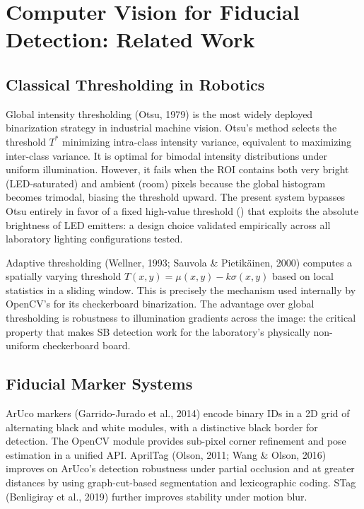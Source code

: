 \section{Computer Vision for Fiducial Detection: Related Work}

\subsection{Classical Thresholding in Robotics}

Global intensity thresholding (Otsu, 1979) is the most widely deployed binarization strategy in industrial machine vision. Otsu's method selects the threshold $T^*$ minimizing intra-class intensity variance, equivalent to maximizing inter-class variance. It is optimal for bimodal intensity distributions under uniform illumination. However, it fails when the ROI contains both very bright (LED-saturated) and ambient (room) pixels because the global histogram becomes trimodal, biasing the threshold upward. The present system bypasses Otsu entirely in favor of a fixed high-value threshold () that exploits the absolute brightness of LED emitters: a design choice validated empirically across all laboratory lighting configurations tested.

Adaptive thresholding (Wellner, 1993; Sauvola \& Pietikäinen, 2000) computes a spatially varying threshold $T(x,y) = \mu(x,y) - k\sigma(x,y)$ based on local statistics in a sliding window. This is precisely the mechanism used internally by OpenCV's  for its checkerboard binarization. The advantage over global thresholding is robustness to illumination gradients across the image: the critical property that makes SB detection work for the laboratory's physically non-uniform checkerboard board.

\subsection{Fiducial Marker Systems}

ArUco markers (Garrido-Jurado et al., 2014) encode binary IDs in a 2D grid of alternating black and white modules, with a distinctive black border for detection. The OpenCV  module provides sub-pixel corner refinement and pose estimation in a unified API. AprilTag (Olson, 2011; Wang \& Olson, 2016) improves on ArUco's detection robustness under partial occlusion and at greater distances by using graph-cut-based segmentation and lexicographic coding. STag (Benligiray et al., 2019) further improves stability under motion blur.


